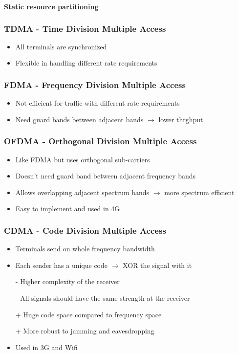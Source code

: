 \textbf{Static resource partitioning}

\subsubsection{TDMA - Time Division Multiple Access}
\begin{itemize}
	\item All terminals are synchronized
	\item Flexible in handling different rate requirements
\end{itemize}
\subsubsection{FDMA - Frequency Division Multiple Access}
\begin{itemize}
	\item Not efficient for traffic with different rate requirements
	\item Need guard bands between adjacent bands $\rightarrow$ lower thrghput 
\end{itemize}
\subsubsection{OFDMA - Orthogonal Division Multiple Access}
\begin{itemize}
	\item Like FDMA but uses orthogonal sub-carriers
	\item Doesn't need guard band between adjacent frequency bands
	\item Allows overlapping adjacent spectrum bands $\rightarrow$ more spectrum efficient
	\item Easy to implement and used in 4G
\end{itemize}
\subsubsection{CDMA - Code Division Multiple Access}
\begin{itemize}
	\item Terminals send on whole frequency bandwidth
	\item Each sender has a unique code $\rightarrow$ XOR the signal with it
	\item[-] Higher complexity of the receiver
	\item[-] All signals should have the same strength at the receiver
	\item[+] Huge code space compared to frequency space
	\item[+] More robust to jamming and eavesdropping
	\item Used in 3G and Wifi
\end{itemize}
